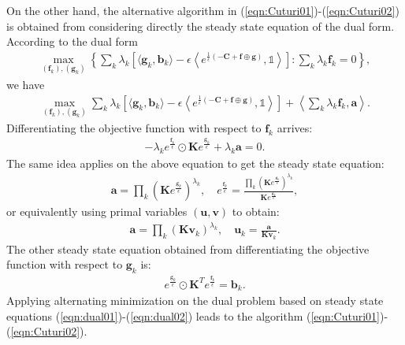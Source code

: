 \documentclass[11pt]{book}
\begin{document}
On the other hand, the alternative algorithm in (\ref{eqn:Cuturi01})-(\ref{eqn:Cuturi02}) is obtained from considering directly the steady state equation of the dual form. According to the dual form
\begin{align}
\max_{(\mathbf{f}_k),(\mathbf{g}_k)}  \left\{ \sum_k \lambda_k \left[ \langle \mathbf{g}_k, \mathbf{b}_k \rangle - \epsilon \left \langle e^{\frac{1}{\epsilon}(-\mathbf{C}+\mathbf{f}\oplus\mathbf{g})}, \mathbb{1} \right \rangle   \right] : \sum_k \lambda_k \mathbf{f}_k = 0 \right\},
\end{align}
we have
\begin{align*}
\max_{(\mathbf{f}_k),(\mathbf{g}_k)}  \sum_k \lambda_k \left[ \langle \mathbf{g}_k, \mathbf{b}_k \rangle - \epsilon \left \langle e^{\frac{1}{\epsilon}(-\mathbf{C}+\mathbf{f}\oplus\mathbf{g})}, \mathbb{1} \right \rangle   \right] 
+ \left\langle \sum_{k} \lambda_k\mathbf{f}_k , \mathbf{a} \right\rangle.
\end{align*}
Differentiating the objective function with respect to $\mathbf{f}_k$ arrives:
\begin{align*}
-\lambda_k e^{\frac{\mathbf{f}_k}{\epsilon}} \odot \mathbf{K} e^{\frac{\mathbf{g}_k}{\epsilon}} + \lambda_k \mathbf{a} = 0.
\end{align*}
The same idea applies on the above equation to get the steady state equation:
\begin{align*}
\mathbf{a} = \prod_k (\mathbf{K}e^{\frac{\mathbf{g}_k}{\epsilon}})^{\lambda_k}, \quad e^{\frac{\mathbf{f}_k}{\epsilon}} = \frac{\prod_k (\mathbf{K}e^{\frac{\mathbf{g}_k}{\epsilon}})^{\lambda_k}}{\mathbf{K}e^{\frac{\mathbf{g}_k}{\epsilon}}},
\end{align*}
or equivalently using primal variables $(\mathbf{u},\mathbf{v})$ to obtain:
\begin{align}\label{eqn:dual01}
\mathbf{a} = \prod_k (\mathbf{K}\mathbf{v}_k)^{\lambda_k},
\quad \mathbf{u}_k = \frac{\mathbf{a}}{\mathbf{K}\mathbf{v}_k}.
\end{align}
The other steady state equation obtained from differentiating the objective function with respect to $\mathbf{g}_k$ is:
\begin{align}\label{eqn:dual02}
e^{\frac{\mathbf{g}_k}{\epsilon}} \odot \mathbf{K}^T e^{\frac{\mathbf{f}_k}{\epsilon}}  = \mathbf{b}_k.
\end{align}
Applying alternating minimization on the dual problem based on steady state equations (\ref{eqn:dual01})-(\ref{eqn:dual02}) leads to the algorithm (\ref{eqn:Cuturi01})-(\ref{eqn:Cuturi02}).
\end{document}
